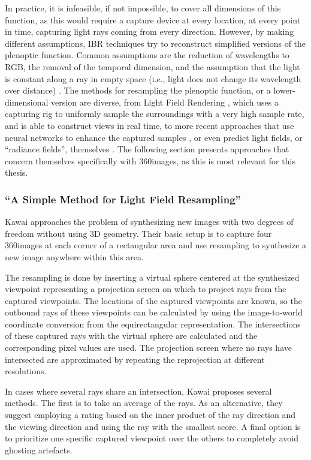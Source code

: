 In practice, it is infeasible, if not impossible, to cover all dimensions of this function, as this would require a capture device at every location, at every point in time, capturing light rays coming from every direction. However, by making different assumptions, IBR techniques try to reconstruct simplified versions of the plenoptic function. Common assumptions are the reduction of wavelengths to RGB, the removal of the temporal dimension, and the assumption that the light is constant along a ray in empty space (i.e., light does not change its wavelength over distance) \cite{survey2004}.
The methods for resampling the plenoptic function, or a lower-dimensional version are diverse, from Light Field Rendering \cite{lightfield}, which uses a capturing rig to uniformly sample the surroundings with a very high sample rate, and is able to construct views in real time, to more recent approaches that use neural networks to enhance the captured samples \cite{cnn}, or even predict light fields, or ``radiance fields'', themselves \cite{nerf}. The following section presents approaches that concern themselves specifically with 360\degree images, as this is most relevant for this thesis.

\subsubsection{``A Simple Method for Light Field Resampling'' \cite{simple_poster}}
Kawai \cite{simple_poster} approaches the problem of synthesizing new images with two degrees of freedom without using 3D geometry. Their basic setup is to capture four 360\degree images at each corner of a rectangular area and use resampling to synthesize a new image anywhere within this area.

The resampling is done by inserting a virtual sphere centered at the synthesized viewpoint representing a projection screen on which to project rays from the captured viewpoints. The locations of the captured viewpoints are known, so the outbound rays of these viewpoints can be calculated by using the image-to-world coordinate conversion from the equirectangular representation. The intersections of these captured rays with the virtual sphere are calculated and the corresponding pixel values are used. The projection screen where no rays have intersected are approximated by repeating the reprojection at different resolutions.

In cases where several rays share an intersection, Kawai proposes several methods. The first is to take an average of the rays. As an alternative, they suggest employing a rating based on the inner product of the ray direction and the viewing direction and using the ray with the smallest score. A final option is to prioritize one specific captured viewpoint over the others to completely avoid ghosting artefacts.

